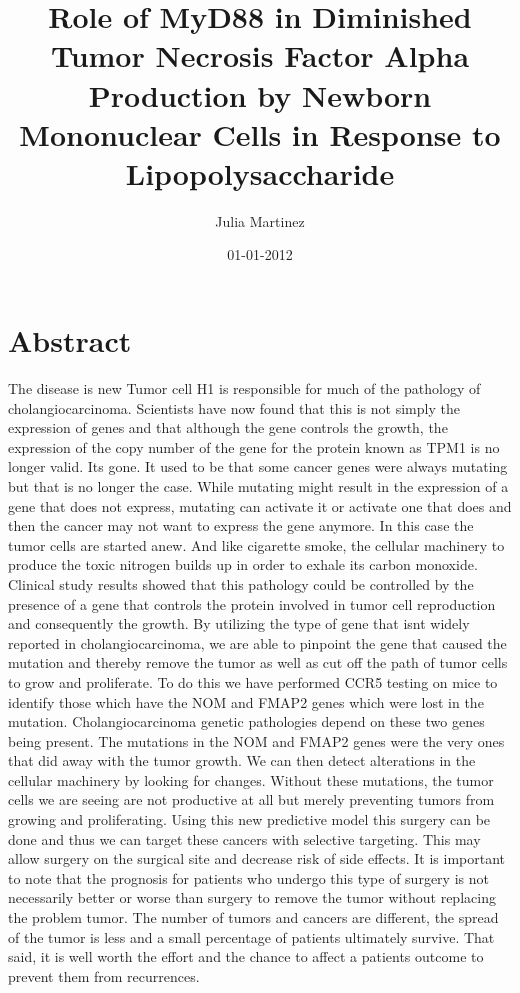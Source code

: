 \documentclass{article}%
\title{Role of MyD88 in Diminished Tumor Necrosis Factor Alpha Production by Newborn Mononuclear Cells in Response to Lipopolysaccharide}%
\author{Julia Martinez}%
\affil{Department of Minimally Invasive Surgery, The First Affiliated Hospital of Nanjing Medical University, Nanjing 210029, P.R. China}%
\date{01{-}01{-}2012}%
\begin{document}
%
\normalsize%
\maketitle%
\section{Abstract}%
\label{sec:Abstract}%
The disease is new\newline%
Tumor cell H1 is responsible for much of the pathology of cholangiocarcinoma.\newline%
Scientists have now found that this is not simply the expression of genes and that although the gene controls the growth, the expression of the copy number of the gene for the protein known as TPM1 is no longer valid. Its gone.\newline%
It used to be that some cancer genes were always mutating but that is no longer the case. While mutating might result in the expression of a gene that does not express, mutating can activate it or activate one that does and then the cancer may not want to express the gene anymore. In this case the tumor cells are started anew. And like cigarette smoke, the cellular machinery to produce the toxic nitrogen builds up in order to exhale its carbon monoxide.\newline%
Clinical study results showed that this pathology could be controlled by the presence of a gene that controls the protein involved in tumor cell reproduction and consequently the growth. By utilizing the type of gene that isnt widely reported in cholangiocarcinoma, we are able to pinpoint the gene that caused the mutation and thereby remove the tumor as well as cut off the path of tumor cells to grow and proliferate.\newline%
To do this we have performed CCR5 testing on mice to identify those which have the NOM and FMAP2 genes which were lost in the mutation. Cholangiocarcinoma genetic pathologies depend on these two genes being present. The mutations in the NOM and FMAP2 genes were the very ones that did away with the tumor growth. We can then detect alterations in the cellular machinery by looking for changes. Without these mutations, the tumor cells we are seeing are not productive at all but merely preventing tumors from growing and proliferating.\newline%
Using this new predictive model this surgery can be done and thus we can target these cancers with selective targeting. This may allow surgery on the surgical site and decrease risk of side effects. It is important to note that the prognosis for patients who undergo this type of surgery is not necessarily better or worse than surgery to remove the tumor without replacing the problem tumor. The number of tumors and cancers are different, the spread of the tumor is less and a small percentage of patients ultimately survive. That said, it is well worth the effort and the chance to affect a patients outcome to prevent them from recurrences.
\end{document}
